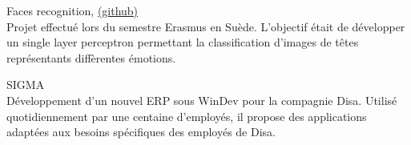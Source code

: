 {\large Faces recognition, \href{https://github.com/ThomasRanvier/faces_recognition_nn}{(github)}}
\\
{\small Projet effectu\'e lors du semestre Erasmus en Su\`ede.
L'objectif \'etait de d\'evelopper un single layer perceptron permettant la classification d'images de t\^etes représentants diff\`erentes \'emotions.}

\medskip

{\large SIGMA}
\\
{\small D\'eveloppement d'un nouvel ERP sous WinDev pour la compagnie Disa.
Utilis\'e quotidiennement par une centaine d'employ\'es, il propose des applications adapt\'ees aux besoins sp\'ecifiques des employ\'es de Disa.}

\medskip


